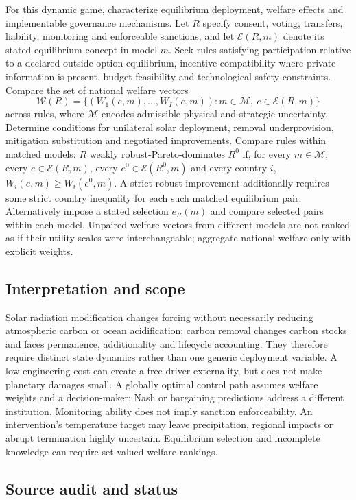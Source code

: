 \documentclass[11pt,a4paper]{article}
\begin{document}
For this dynamic game, characterize equilibrium deployment, welfare effects and implementable governance mechanisms. Let $R$ specify consent, voting, transfers, liability, monitoring and enforceable sanctions, and let $\mathcal E(R,m)$ denote its stated equilibrium concept in model $m$. Seek rules satisfying participation relative to a declared outside-option equilibrium, incentive compatibility where private information is present, budget feasibility and technological safety constraints. Compare the set of national welfare vectors
\[
\mathcal W(R)=
\{(W_1(e,m),\ldots,W_I(e,m)):
m\in\mathcal M,\ e\in\mathcal E(R,m)\}
\]
across rules, where $\mathcal M$ encodes admissible physical and strategic uncertainty. Determine conditions for unilateral solar deployment, removal underprovision, mitigation substitution and negotiated improvements. Compare rules within matched models: $R$ weakly robust-Pareto-dominates $R^0$ if, for every $m\in\mathcal M$, every $e\in\mathcal E(R,m)$, every $e^0\in\mathcal E(R^0,m)$ and every country $i$, $W_i(e,m)\ge W_i(e^0,m)$. A strict robust improvement additionally requires some strict country inequality for each such matched equilibrium pair. Alternatively impose a stated selection $e_R(m)$ and compare selected pairs within each model. Unpaired welfare vectors from different models are not ranked as if their utility scales were interchangeable; aggregate national welfare only with explicit weights.

\subsection*{Interpretation and scope}

Solar radiation modification changes forcing without necessarily reducing atmospheric carbon or ocean acidification; carbon removal changes carbon stocks and faces permanence, additionality and lifecycle accounting. They therefore require distinct state dynamics rather than one generic deployment variable. A low engineering cost can create a free-driver externality, but does not make planetary damages small. A globally optimal control path assumes welfare weights and a decision-maker; Nash or bargaining predictions address a different institution. Monitoring ability does not imply sanction enforceability. An intervention's temperature target may leave precipitation, regional impacts or abrupt termination highly uncertain. Equilibrium selection and incomplete knowledge can require set-valued welfare rankings.

\subsection*{Source audit and status}
\end{document}
